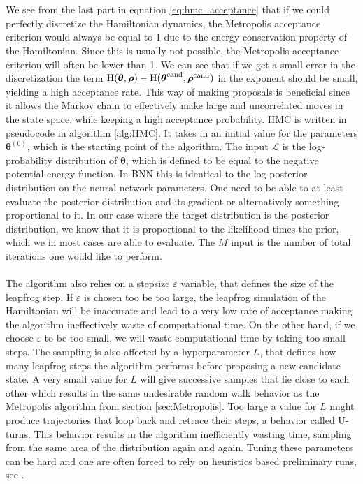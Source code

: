 \\ 
\\
We see from the last part in equation \ref{eq:hmc_acceptance} that if we could perfectly discretize the Hamiltonian dynamics, the Metropolis acceptance criterion would always be equal to 1 due to the energy conservation property of the Hamiltonian. Since this is usually not possible, the Metropolis acceptance criterion will often be lower than 1. We can see that if we get a small error in the discretization the term  $\operatorname{H}(\boldsymbol{\theta},\boldsymbol{\rho})-\operatorname{H}(\boldsymbol{\theta}^{\text{cand}},\boldsymbol{\rho}^{\text{cand}})$ in the exponent should be small, yielding a high acceptance rate. This way of making proposals is beneficial since it allows the Markov chain to effectively make large and uncorrelated moves in the state space, while keeping a high acceptance probability. HMC is written in pseudocode in algorithm \ref{alg:HMC}. It takes in an initial value for the parameters $\boldsymbol{\theta}^{(0)}$, which is the starting point of the algorithm. The input $\mathcal{L}$ is the log-probability distribution of $\boldsymbol{\theta}$, which is defined to be equal to the negative potential energy function. In BNN this is identical to the log-posterior distribution on the neural network parameters. One need to be able to at least evaluate the posterior distribution and its gradient or alternatively something proportional to it. In our case where the target distribution is the posterior distribution, we know that it is proportional to the likelihood times the prior, which we in most cases are able to evaluate. The $M$ input is the number of total iterations one would like to perform.
\\
\\
The algorithm also relies on a stepsize $\varepsilon$ variable, that defines the size of the leapfrog step. If $\varepsilon$ is chosen too be too large, the leapfrog simulation of the Hamiltonian will be inaccurate and lead to a very low rate of acceptance making the algorithm ineffectively waste of computational time. On the other hand, if we choose $\varepsilon$ to be too small, we will waste computational time by taking too small steps. The sampling is also affected by a hyperparameter $L$, that defines how many leapfrog steps the algorithm performs before proposing a new candidate state. A very small value for $L$ will give successive samples that lie close to each other which results in the same undesirable random walk behavior as the Metropolis algorithm from section \ref{sec:Metropolis}. Too large a value for $L$ might produce trajectories that loop back and retrace their steps, a behavior called U-turns. This behavior results in the algorithm inefficiently wasting time, sampling from the same area of the distribution again and again. Tuning these parameters can be hard and one are often forced to rely on heuristics based preliminary runs, see \cite{neal2012mcmc}.

